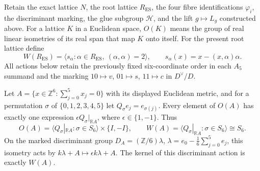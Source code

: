 Retain the exact lattice \(N\), the root lattice \(R_{\mathrm{ES}}\),
the four fibre identifications \(\varphi_i\), the discriminant marking,
the glue subgroup \(\mathcal H\), and the lift \(g\mapsto L_g\)
constructed above.  For a lattice \(K\) in a Euclidean space, \(O(K)\)
means the group of real linear isometries of its real span that map
\(K\) onto itself.  For the present root lattice define
\[
 W(R_{\mathrm{ES}})
 =\langle s_\alpha:\alpha\in R_{\mathrm{ES}},\ (\alpha,\alpha)=2\rangle,
 \qquad s_\alpha(x)=x-(x,\alpha)\alpha.
\]
All actions below retain the previously fixed six-coordinate order in
each \(A_5\) summand and the marking \(10\mapsto v\),
\(01\mapsto s\), \(11\mapsto c\) in \(D^\vee/D\).

\begin{theorem}
\label{esn:fa:thm:a5-automorphisms}
Let \(A=\{x\in\mathbb Z^6:\sum_{j=0}^5x_j=0\}\) with its displayed
Euclidean metric, and for a permutation \(\sigma\) of
\(\{0,1,2,3,4,5\}\) let \(Q_\sigma e_j=e_{\sigma(j)}\).
Every element of \(O(A)\) has exactly one expression
\(\epsilon Q_\sigma|_{\mathbb R A}\), where
\(\epsilon\in\{1,-1\}\).  Thus
\[
 O(A)=\langle Q_\sigma|_{\mathbb R A}:\sigma\in S_6\rangle
                  \times\{I,-I\},
 \qquad W(A)=\langle Q_\sigma|_{\mathbb R A}:\sigma\in S_6\rangle
                  \cong S_6.
\]
On the marked discriminant group
\(D_A=(\mathbb Z/6)\lambda\),
\(\lambda=e_0-\frac16\sum_{j=0}^5e_j\), this isometry acts by
\(k\lambda+A\mapsto\epsilon k\lambda+A\).  The kernel of this
discriminant action is exactly \(W(A)\).
\end{theorem}

